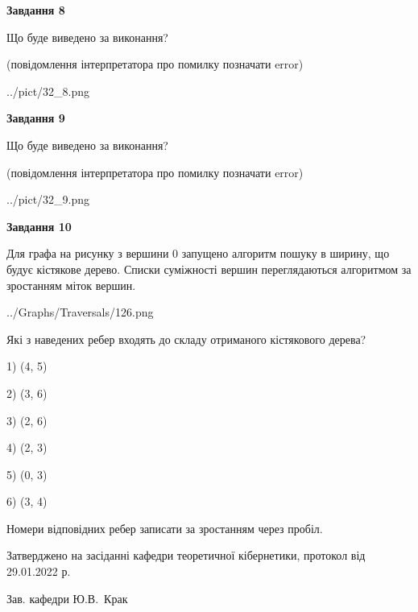 \documentclass[12pt, ukrainian]{article}
\begin{document}
{\begin {large}
{\begin {center}\textbf{Завдання 8}\end {center}}\par
Що буде виведено за виконання?\par
 (повідомлення інтерпретатора про помилку позначати error)
\begin{center}
	{../pict/32_8.png}
\end{center}
\newpage

{\begin {center}\textbf{Завдання 9}\end {center}}\par
Що буде виведено за виконання?\par
 (повідомлення інтерпретатора про помилку позначати error)\par
\begin{center}
	{../pict/32_9.png}
\end{center}
\newpage

{\begin {center}\textbf{Завдання 10}\end {center}}\par
Для графа на рисунку з вершини 0 запущено алгоритм пошуку в ширину, що будує кістякове дерево. Списки суміжності вершин переглядаються алгоритмом за зростанням міток вершин.\par
\begin{center}
	{../Graphs/Traversals/126.png}
\end{center}
\par Які з наведених ребер входять до складу отриманого кістякового дерева?\par
1) (4, 5)\par
2) (3, 6)\par
3) (2, 6)\par
4) (2, 3)\par
5) (0, 3)\par
6) (3, 4)\par
{\vskip 15pt} Номери відповідних ребер записати за зростанням через пробіл.\par
\newpage


\end {large}
}
{\smallskip \begin {small} Затверджено на засіданні кафедри теоретичної кібернетики, протокол  від   29.01.2022 р.\par\smallskip\smallskip
{\parbox {6.5 cm}{Зав. кафедри \dotfill Ю.В.~Крак}} \end{small}}
\end{document}
